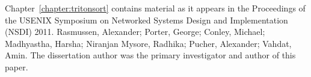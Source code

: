 Chapter~\ref{chapter:tritonsort} contains material as it appears in the
Proceedings of the USENIX Symposium on Networked Systems Design and
Implementation (NSDI) 2011. Rasmussen, Alexander; Porter, George; Conley,
Michael; Madhyastha, Harsha; Niranjan Mysore, Radhika; Pucher, Alexander;
Vahdat, Amin. The dissertation author was the primary investigator and author
of this paper.
